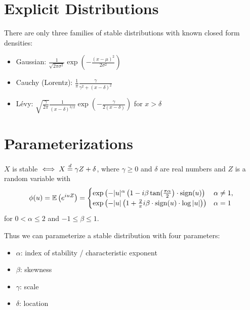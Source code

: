 \documentclass[twoside,10pt]{report}
\begin{document}
\section{Explicit Distributions}

There are only three families of stable distributions with known closed form densities:
\begin{itemize}
	\item Gaussian: $\frac{1}{\sqrt{2 \pi \sigma^{2}} } \exp\left( -\frac{(x-\mu)^2}{2\sigma^{2}}  \right)$ 

	\item Cauchy (Lorentz): $\frac{1}{\pi} \frac{\gamma}{\gamma^{2}+(x-\delta)^2} $ 

	\item L\'evy: $\sqrt{\frac{\gamma}{2\pi} } \frac{1}{(x-\delta)^{3/2}} \exp\left( -\frac{\gamma}{2(x-\delta)}  \right)$ for $x > \delta$
\end{itemize}




\section{Parameterizations}

\begin{prop}
$X$ is stable $\iff X\stackrel{d}{=} \gamma Z + \delta$, where $\gamma \geq 0$ and $\delta$ are real numbers and $Z$ is a random variable with 
\[
\phi(u) = \mathbb{E} \left(  e^{i u Z}  \right) =
\begin{cases}
	\exp\left( -|u|^{\alpha}\left( 1- i \beta\tan(\frac{\pi \alpha}{2}  \right)\cdot \operatorname{sign}(u) \right) & \alpha \neq 1, \\
	\exp\left( -|u| \left( 1 + \frac{2}{\pi} i \beta \cdot \operatorname{sign}(u) \cdot \log |u|  \right) \right) &  \alpha = 1
\end{cases}
\] 
for $0 < \alpha \leq 2$ and $-1 \leq \beta \leq 1$.
\end{prop}
Thus we can parameterize a stable distribution with four parameters:
\begin{itemize}
	\item $\alpha$: index of stability / characteristic exponent
	\item $\beta$: skewness
	\item $\gamma$: scale
	\item $\delta$: location
\end{itemize}
\end{document}
